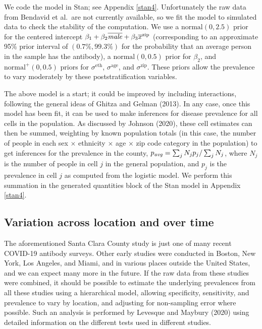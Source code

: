 \documentclass[11pt]{article}
\begin{document}
We code the model in Stan; see Appendix \ref{stan4}.  Unfortunately
the raw data from Bendavid et al.\ are not currently available, so we
fit the model to simulated data to check the stability of the
computation.  We use a $\mbox{normal}(0,2.5)$ prior for the centered
intercept
$\beta_1 + \beta_2\overline{\it male} + \beta_3\overline{x}^{\rm zip}$
(corresponding to an approximate 95\% prior interval of
$(0.7\%, 99.3\%)$ for the probability that an average person in the
sample has the antibody), a $\mbox{normal}(0,0.5)$ prior for
$\beta_2$, and $\mbox{normal}^+(0, 0.5)$ priors for
$\sigma^{\textrm{eth}}$, $\sigma^{\textrm{age}}$, and
$\sigma^{\textrm{zip}}$.  These priors allow the prevalence to vary
moderately by these poststratification variables.

The above model is a start; it could be improved by including
interactions, following the general ideas of Ghitza and Gelman (2013).
In any case, once this model has been fit, it can be used to make
inferences for disease prevalence for all cells in the population. As
discussed by Johnson (2020), these cell estimates can then be summed,
weighting by known population totals (in this case, the number of
people in each sex $\times$ ethnicity $\times$ age $\times$ zip code
category in the population) to get inferences for the prevalence in
the county, $p_{\it avg} = \sum_jN_jp_j/\sum_jN_j$, where $N_j$ is the
number of people in cell $j$ in the general population, and $p_j$ is
the prevalence in cell $j$ as computed from the logistic model.  We
perform this summation in the generated quantities block of the Stan
model in Appendix \ref{stan4}.

\subsection{Variation across location and over time}\label{muiltiple}

The aforementioned Santa Clara County study is just one of many recent
COVID-19 antibody surveys.  Other early studies were conducted in
Boston, New York, Los Angeles, and Miami, and in various places
outside the United States, and we can expect many more in the future.
If the raw data from these studies were combined, it should be
possible to estimate the underlying prevalences from all these studies
using a hierarchical model, allowing specificity, sensitivity, and
prevalence to vary by location, and adjusting for non-sampling error
where possible.  Such an analysis is performed by Levesque and Maybury
(2020) using detailed information on the different tests used in
different studies.
\end{document}
